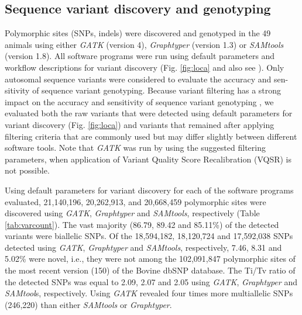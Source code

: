\documentclass[../main.tex]{subfiles}
\begin{document}
\subsection*{Sequence variant discovery and genotyping}

Polymorphic  sites  (SNPs,  indels)  were  discovered  and  genotyped in the 49 animals using either \emph{GATK} (version 4), \emph{Graphtyper} (version  1.3)  or  \emph{SAMtools} (version  1.8). All software programs were run using default parameters and  workflow  descriptions  for  variant  discovery  (Fig. \ref{fig:loca} and  also  see ). Only autosomal sequence variants were considered  to  evaluate  the  accuracy  and  sen-sitivity  of sequence  variant genotyping. Because variant filtering has a strong impact on the accuracy and sensitivity of sequence variant genotyping \citep{carson2014effective,jun2015efficient}, we evaluated both  the  raw  variants  that  were  detected  using  default  parameters  for  variant  discovery  (Fig. \ref{fig:loca})  and  variants  that  remained  after  applying  filtering  criteria  that  are  commonly  used  but  may  differ  slightly  between  different software tools. Note that \emph{GATK} was run by using the suggested filtering parameters, when application of Variant Quality Score Recalibration (VQSR) is not possible.

Using default parameters for variant discovery for each of the software programs evaluated, 21,140,196, 20,262,913, and 20,668,459 polymorphic sites were discovered using \emph{GATK}, \emph{Graphtyper} and \emph{SAMtools}, respectively (Table \ref{tab:varcount}). The vast majority (86.79, 89.42 and 85.11\%) of the detected variants were biallelic SNPs. Of the 18,594,182, 18,120,724 and 17,592,038 SNPs detected using \emph{GATK},  \emph{Graphtyper} and \emph{SAMtools}, respectively, 7.46, 8.31 and 5.02\% were novel, i.e., they were not among the 102,091,847 polymorphic sites of the most recent version (150) of the Bovine dbSNP database. The Ti/Tv ratio of the detected SNPs was equal to 2.09, 2.07 and 2.05 using \emph{GATK}, \emph{Graphtyper} and \emph{SAMtool}s, respectively. Using \emph{GATK} revealed four times more multiallelic SNPs (246,220) than either \emph{SAMtools} or \emph{Graphtyper}.
\end{document}
